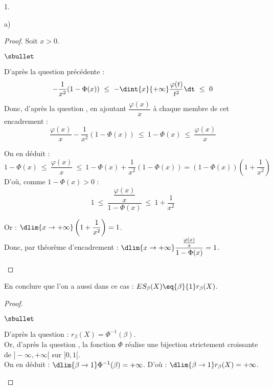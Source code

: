 \documentclass[11pt]{article}%
\begin{document}
\begin{noliste}{1.}
\begin{noliste}{a)}
\begin{proof}
      Soit $x>0$.
      \begin{noliste}{$\sbullet$}
	\item D'après la question précédente :
	\[
	  -\dfrac{1}{x^2}(1-\Phi(x)) \ \leq \ - \dint{x}{+\infty}
	  \dfrac{\varphi(t)}{t^2} \dt \ \leq \ 0
	\]
	Donc, d'après la question , en ajoutant $\dfrac{
	\varphi(x)}{x}$ à chaque membre de cet encadrement :
	\[
	  \dfrac{\varphi(x)}{x} - \dfrac{1}{x^2}(1-\Phi(x)) \ \leq \
	  1-\Phi(x) \ \leq \ \dfrac{\varphi(x)}{x}
	\]
	
	\item On en déduit :
	\[
	  1-\Phi(x) \ \leq \ \dfrac{\varphi(x)}{x} \ \leq \
	  1-\Phi(x) + \dfrac{1}{x^2}(1-\Phi(x)) = (1-\Phi(x))
	  \left(1+\dfrac{1}{x^2}\right)
	\]
	D'où, comme $1-\Phi(x) >0$ :
	\[
	  1 \ \leq \ \dfrac{\dfrac{\varphi(x)}{x}}{1-\Phi(x)} \ \leq \
	  1+ \dfrac{1}{x^2}
	\]
	\item Or : $\dlim{x\to +\infty} \left(1+ \dfrac{1}{x^2}\right) 
	=1$.\\
	Donc, par théorème d'encadrement : $\dlim{x\to + \infty} 
	\dfrac{\frac{\varphi(x)}{x}}{1-\Phi(x)}=1$.
	\conc{Ainsi : $1- \Phi(x) \eqx{+\infty} 
	\dfrac{\varphi(x)}{x}$.}~\\[-1.2cm]
      \end{noliste}
    \end{proof}

    
    \item En conclure que l'on a aussi dans ce cas : $ES_\beta(X) 
    \eq{\beta}{1} r_\beta(X)$.
    
    \begin{proof}~
      \begin{noliste}{$\sbullet$}
	\item D'après la question  : $r_\beta(X) = 
	\Phi^{-1}(\beta)$.\\
	Or, d'après la question , la fonction $\Phi$
	réalise une bijection strictement croissante de 
	$]-\infty, +\infty[$ sur $]0,1[$.\\
	On en déduit : $\dlim{\beta \to 1} \Phi^{-1}(\beta)=+\infty$.
	D'où : $\dlim{\beta \to 1} r_\beta(X)=+\infty$.
	
	
	\newpage
	

\end{noliste}
\end{proof}
\end{noliste}
\end{noliste}
\end{document}
